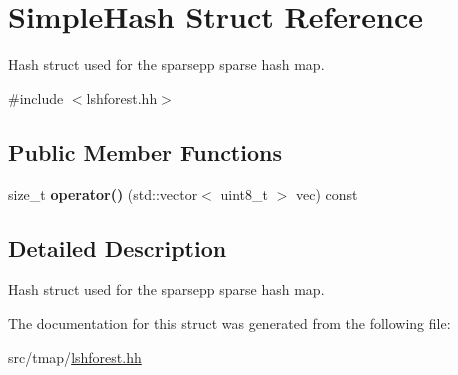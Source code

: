 \hypertarget{structSimpleHash}{}\section{Simple\+Hash Struct Reference}
\label{structSimpleHash}


Hash struct used for the sparsepp sparse hash map.  




{\ttfamily \#include $<$lshforest.\+hh$>$}

\subsection*{Public Member Functions}
\begin{DoxyCompactItemize}
\item 
\mbox{\label{structSimpleHash_abb89901eb1591020804460a3dccbde58}} 
size\+\_\+t {\bfseries operator()} (std\+::vector$<$ uint8\+\_\+t $>$ vec) const
\end{DoxyCompactItemize}


\subsection{Detailed Description}
Hash struct used for the sparsepp sparse hash map. 

The documentation for this struct was generated from the following file\+:\begin{DoxyCompactItemize}
\item 
src/tmap/\hyperlink{lshforest_8hh}{lshforest.\+hh}\end{DoxyCompactItemize}

